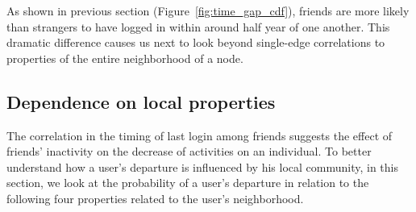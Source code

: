 \documentclass[phd,tocprelim]{cornell}
\renewcommand{\caption}[1]{\singlespacing\hangcaption{#1}\normalspacing}
\begin{document}

As shown in previous section (Figure~\ref{fig:time_gap_cdf}), friends are more likely than strangers to have logged in within around half year of
one another.  This dramatic difference causes us next to look beyond
single-edge correlations to properties of the entire neighborhood of a
node.

\subsection{Dependence on local properties}
The correlation in the timing of last login among friends suggests the effect of friends' inactivity on the decrease of activities on an individual. To better understand how a user's departure is influenced by his local community, in this section, we look at the probability of a user's departure in relation to the following four properties related to the user's neighborhood.
\end{document}
